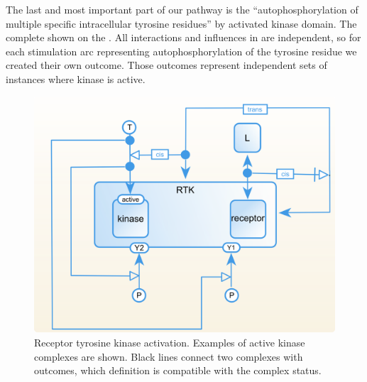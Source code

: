 The last and most important part of our pathway is the ``autophosphorylation of multiple specific intracellular tyrosine residues'' by activated kinase domain. The complete  shown on the . All interactions and influences in \SBGNERLone are independent, so for each stimulation arc representing autophosphorylation of the tyrosine residue we created their own outcome. Those outcomes represent independent sets of instances where kinase is active.

\begin{figure}[H]
  \centering
  \vspace*{-0.75em}
  \includegraphics[scale=0.75]{examples/rtk.png}
   \caption{Receptor tyrosine kinase activation. Examples of active kinase complexes are shown. Black lines connect two complexes with outcomes, which definition is compatible with the complex status. }
  \label{fig:rtk-full}
\end{figure}


